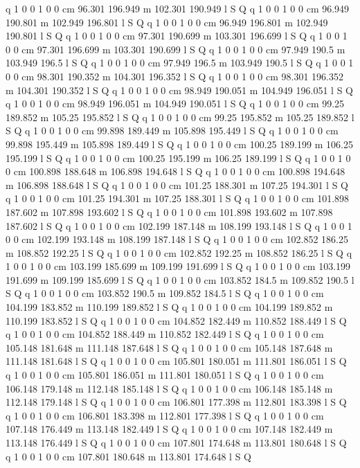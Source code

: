 q 1 0 0 1 0 0 cm
96.301 196.949 m 102.301 190.949 l S Q
q 1 0 0 1 0 0 cm
96.949 190.801 m 102.949 196.801 l S Q
q 1 0 0 1 0 0 cm
96.949 196.801 m 102.949 190.801 l S Q
q 1 0 0 1 0 0 cm
97.301 190.699 m 103.301 196.699 l S Q
q 1 0 0 1 0 0 cm
97.301 196.699 m 103.301 190.699 l S Q
q 1 0 0 1 0 0 cm
97.949 190.5 m 103.949 196.5 l S Q
q 1 0 0 1 0 0 cm
97.949 196.5 m 103.949 190.5 l S Q
q 1 0 0 1 0 0 cm
98.301 190.352 m 104.301 196.352 l S Q
q 1 0 0 1 0 0 cm
98.301 196.352 m 104.301 190.352 l S Q
q 1 0 0 1 0 0 cm
98.949 190.051 m 104.949 196.051 l S Q
q 1 0 0 1 0 0 cm
98.949 196.051 m 104.949 190.051 l S Q
q 1 0 0 1 0 0 cm
99.25 189.852 m 105.25 195.852 l S Q
q 1 0 0 1 0 0 cm
99.25 195.852 m 105.25 189.852 l S Q
q 1 0 0 1 0 0 cm
99.898 189.449 m 105.898 195.449 l S Q
q 1 0 0 1 0 0 cm
99.898 195.449 m 105.898 189.449 l S Q
q 1 0 0 1 0 0 cm
100.25 189.199 m 106.25 195.199 l S Q
q 1 0 0 1 0 0 cm
100.25 195.199 m 106.25 189.199 l S Q
q 1 0 0 1 0 0 cm
100.898 188.648 m 106.898 194.648 l S Q
q 1 0 0 1 0 0 cm
100.898 194.648 m 106.898 188.648 l S Q
q 1 0 0 1 0 0 cm
101.25 188.301 m 107.25 194.301 l S Q
q 1 0 0 1 0 0 cm
101.25 194.301 m 107.25 188.301 l S Q
q 1 0 0 1 0 0 cm
101.898 187.602 m 107.898 193.602 l S Q
q 1 0 0 1 0 0 cm
101.898 193.602 m 107.898 187.602 l S Q
q 1 0 0 1 0 0 cm
102.199 187.148 m 108.199 193.148 l S Q
q 1 0 0 1 0 0 cm
102.199 193.148 m 108.199 187.148 l S Q
q 1 0 0 1 0 0 cm
102.852 186.25 m 108.852 192.25 l S Q
q 1 0 0 1 0 0 cm
102.852 192.25 m 108.852 186.25 l S Q
q 1 0 0 1 0 0 cm
103.199 185.699 m 109.199 191.699 l S Q
q 1 0 0 1 0 0 cm
103.199 191.699 m 109.199 185.699 l S Q
q 1 0 0 1 0 0 cm
103.852 184.5 m 109.852 190.5 l S Q
q 1 0 0 1 0 0 cm
103.852 190.5 m 109.852 184.5 l S Q
q 1 0 0 1 0 0 cm
104.199 183.852 m 110.199 189.852 l S Q
q 1 0 0 1 0 0 cm
104.199 189.852 m 110.199 183.852 l S Q
q 1 0 0 1 0 0 cm
104.852 182.449 m 110.852 188.449 l S Q
q 1 0 0 1 0 0 cm
104.852 188.449 m 110.852 182.449 l S Q
q 1 0 0 1 0 0 cm
105.148 181.648 m 111.148 187.648 l S Q
q 1 0 0 1 0 0 cm
105.148 187.648 m 111.148 181.648 l S Q
q 1 0 0 1 0 0 cm
105.801 180.051 m 111.801 186.051 l S Q
q 1 0 0 1 0 0 cm
105.801 186.051 m 111.801 180.051 l S Q
q 1 0 0 1 0 0 cm
106.148 179.148 m 112.148 185.148 l S Q
q 1 0 0 1 0 0 cm
106.148 185.148 m 112.148 179.148 l S Q
q 1 0 0 1 0 0 cm
106.801 177.398 m 112.801 183.398 l S Q
q 1 0 0 1 0 0 cm
106.801 183.398 m 112.801 177.398 l S Q
q 1 0 0 1 0 0 cm
107.148 176.449 m 113.148 182.449 l S Q
q 1 0 0 1 0 0 cm
107.148 182.449 m 113.148 176.449 l S Q
q 1 0 0 1 0 0 cm
107.801 174.648 m 113.801 180.648 l S Q
q 1 0 0 1 0 0 cm
107.801 180.648 m 113.801 174.648 l S Q
